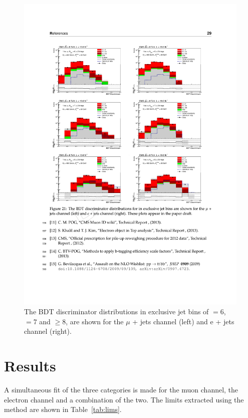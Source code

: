 \begin{figure}
     \includegraphics[width=\textwidth]{images/Run1/BDTjetsplit8TeV.pdf}          
    \caption{The BDT discriminator distributions in exclusive jet bins of \njets$=6$, \njets$=7$ and \njets$\geq8$, are shown for the $\mu$ + jets channel (left) and e + jets channel (right).}
    \label{fig:jetsplitBDT8}
\end{figure}

\section{Results}

A simultaneous fit of the three \njets categories is made for the muon channel, the electron channel and a combination of the two. The limits extracted using the \CLS method are shown in Table~\ref{tab:lims}.


